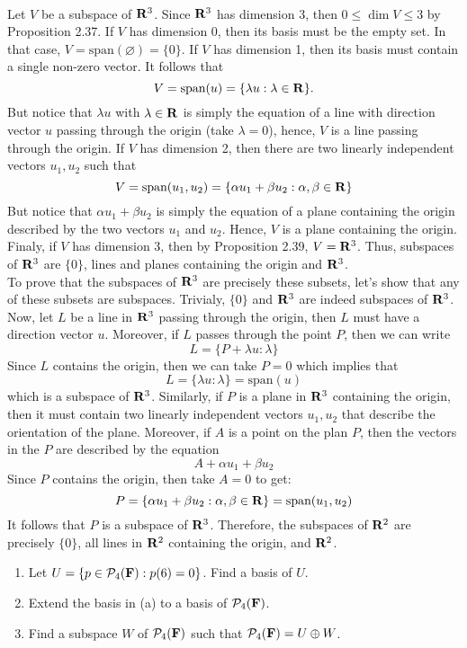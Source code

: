 \begin{solution}
    \\ Let $V$ be a subspace of $\mathbf{R}^3$. Since $\mathbf{R}^3$ has dimension 3, then $0 \leq \dim V \leq 3$ by Proposition 2.37. If $V$ has dimension 0, then its basis must be the empty set. In that case, $V = \text{span}(\varnothing) = \{0\}$. If $V$ has dimension 1, then its basis must contain a single non-zero vector. It follows that 
    $$V = \text{span}(u) = \{\lambda u : \lambda \in \mathbf{R}\}.$$
    But notice that $\lambda u$ with $\lambda \in \mathbf{R}$ is simply the equation of a line with direction vector $u$ passing through the origin (take $\lambda = 0$), hence, $V$ is a line passing through the origin. If $V$ has dimension 2, then there are two linearly independent vectors $u_1, u_2$ such that
    $$V = \text{span}(u_1, u_2) = \{\alpha u_1 + \beta u_2 : \alpha, \beta \in \mathbf{R}\}$$ 
    But notice that $\alpha u_1 + \beta u_2$ is simply the equation of a plane containing the origin described by the two vectors $u_1$ and $u_2$. Hence, $V$ is a plane containing the origin. Finaly, if $V$ has dimension 3, then by Proposition 2.39, $V = \mathbf{R}^3$. Thus, subspaces of $\mathbf{R}^3$ are $\{0\}$, lines and planes containing the origin and $\mathbf{R}^3$.\\
    To prove that the subspaces of $\mathbf{R}^3$ are precisely these subsets, let's show that any of these subsets are subspaces. Trivialy, $\{0\}$ and $\mathbf{R}^3$ are indeed subspaces of $\mathbf{R}^3$. Now, let $L$ be a line in $\mathbf{R}^3$ passing through the origin, then $L$ must have a direction vector $u$. Moreover, if $L$ passes through the point $P$, then we can write
    $$L = \{P + \lambda u : \lambda\}$$
    Since $L$ contains the origin, then we can take $P = 0$ which implies that
    $$L = \{\lambda u : \lambda\} = \text{span}(u)$$
    which is a subspace of $\mathbf{R}^3$. Similarly, if $P$ is a plane in $\mathbf{R}^3$ containing the origin, then it must contain two linearly independent vectors $u_1, u_2$ that describe the orientation of the plane. Moreover, if $A$ is a point on the plan $P$, then the vectors in the $P$ are described by the equation
    $$A + \alpha u_1 + \beta u_2$$
    Since $P$ contains the origin, then take $A = 0$ to get:
    $$P = \{\alpha u_1 + \beta u_2 : \alpha, \beta \in \mathbf{R}\} = \text{span}(u_1, u_2)$$
    It follows that $P$ is a subspace of $\mathbf{R}^3$. Therefore, the subspaces of $\mathbf{R}^2$ are precisely $\{0\}$, all lines in $\mathbf{R}^2$ containing the origin, and $\mathbf{R}^2$.\\
\end{solution}

\begin{exercise}
    \vspace*{-0.6cm}
    \begin{enumerate}[label=(\alph*)]
        \item Let $U = \{p \in \mathcal{P}_4(\mathbf{F}):p(6) = 0\}$. Find a basis of $U$.
        \item Extend the basis in (a) to a basis of $\mathcal{P}_4(\mathbf{F})$.
        \item Find a subspace $W$ of $\mathcal{P}_4(\mathbf{F})$ such that $\mathcal{P}_4(\mathbf{F}) = U \oplus W$.\\
    \end{enumerate}
\end{exercise}

